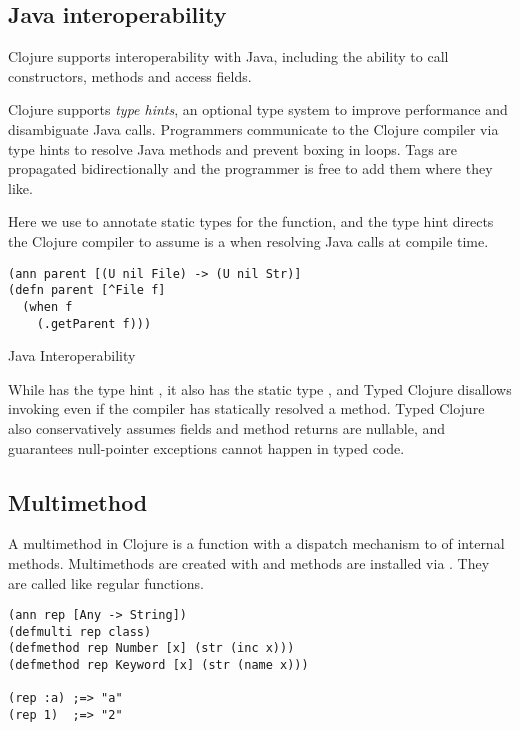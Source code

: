 \subsection{Java interoperability}

Clojure supports interoperability with Java, including the ability to
call constructors, methods and access fields.

Clojure supports \emph{type hints}, an optional type system to improve performance
and disambiguate Java calls.
Programmers communicate to the Clojure compiler via type hints
to resolve Java methods and prevent boxing in loops. Tags are propagated bidirectionally
and the programmer is free to add them where they like.

Here we use  to annotate static types for the function, and the type hint
 directs the Clojure compiler to assume  is a 
when resolving Java calls at compile time.

\begin{listing}
  \begin{verbatim}
(ann parent [(U nil File) -> (U nil Str)]
(defn parent [^File f]
  (when f
    (.getParent f)))
  \end{verbatim}
\caption{Java Interoperability}
\end{listing}

While  has the type hint , it also has the static type ,
and Typed Clojure disallows invoking  even if the compiler
has statically resolved a method.
Typed Clojure also conservatively assumes fields and method returns are nullable,
and guarantees null-pointer exceptions cannot happen in typed code.

\subsection{Multimethod}

A multimethod in Clojure is a function with a dispatch mechanism to
of internal methods. Multimethods are created with {}
and methods are installed via {}.
They are called like regular functions.

\begin{verbatim}
(ann rep [Any -> String])
(defmulti rep class)
(defmethod rep Number [x] (str (inc x)))
(defmethod rep Keyword [x] (str (name x)))

(rep :a) ;=> "a"
(rep 1)  ;=> "2"
\end{verbatim}

